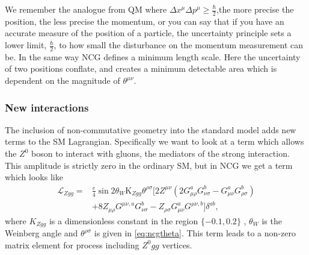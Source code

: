 We remember the analogue from QM where $\Delta x^{\mu} \Delta p^{\mu} \ge \frac{\hbar}{2}$,the more precise the position, the less precise the momentum, or you can say that if you have an accurate measure of the position of a particle, the uncertainty principle sets a lower limit, $\frac{\hbar}{2}$, to how small the disturbance on the momentum measurement can be. In the same way NCG defines a minimum length scale. Here the uncertainty of two positions conflate, and creates a minimum detectable area which is dependent on the magnitude of $\theta^{\mu \nu}$.

\subsubsection{New interactions}
The inclusion of non-commutative geometry into the standard model adds new terms to the SM Lagrangian. Specifically we want to look at a term which allows the $Z^0$ boson to interact with gluons, the mediators of the strong interaction. This amplitude is strictly zero in the ordinary SM, but in NCG we get a term which looks like \cite{melic2005smn}
\begin{align}
	\mathcal{L}_{Zgg} = &\frac{e}{4}\sin{2\theta_W}\textrm{K}_{Zgg}\theta^{\rho\sigma}
	[2 Z^{\mu\nu} (2 G_{\mu\rho}^a G_{\nu\sigma}^b - G_{\mu\nu}^a G_{\rho\sigma}^b) \nonumber \\
	 &+ 8 Z_{\mu\rho} G^{\mu\nu,a} G_{\nu\sigma}^b - Z_{\rho\sigma} G_{\mu\nu}^a G^{\mu\nu,b}
	] \delta^{ab},
\end{align}
where $K_{Zgg}$ is a dimensionless constant in the region $\{-0.1,0.2\}$ \cite{behr2003dnc}, $\theta_W$ is the Weinberg angle and $\theta^{\rho\sigma}$ is given in \eqref{eq:ncgtheta}. This term leads to a non-zero matrix element for process including $Z^0gg$ vertices.





